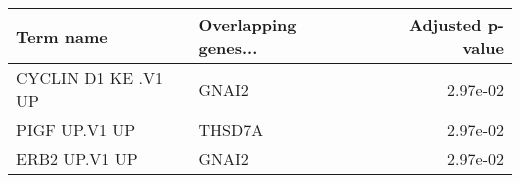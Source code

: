 \begin{tabular}{llr}
\toprule
          Term name & Overlapping genes... &  Adjusted p-value \\
\midrule
CYCLIN D1 KE .V1 UP &                GNAI2 &          2.97e-02 \\
      PIGF UP.V1 UP &               THSD7A &          2.97e-02 \\
      ERB2 UP.V1 UP &                GNAI2 &          2.97e-02 \\
\bottomrule
\end{tabular}
